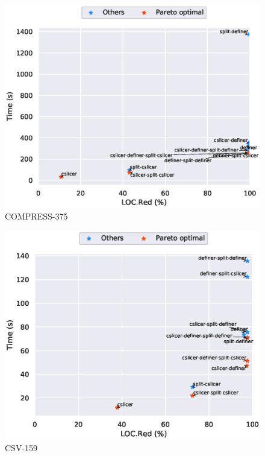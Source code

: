 \begin{figure}
\includegraphics[scale=0.7]{plots/pareto/COMPRESS-375-pareto}
\caption{COMPRESS-375}
\end{figure}
\begin{figure}
\includegraphics[scale=0.7]{plots/pareto/CSV-159-pareto}
\caption{CSV-159}
\end{figure}
